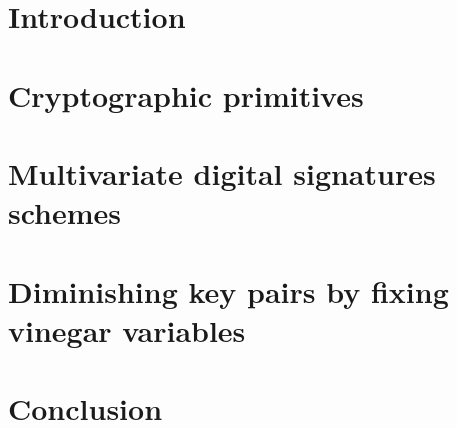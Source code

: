 \documentclass{ufsctex/ufsctex}
\begin{document}
\capa{}
\pretextuais{}
\sumario{}

\chapter{Introduction}

\chapter{Cryptographic primitives}

\chapter{Multivariate digital signatures schemes}








\chapter{Diminishing key pairs by fixing vinegar variables}

\chapter{Conclusion}



\end{document}

